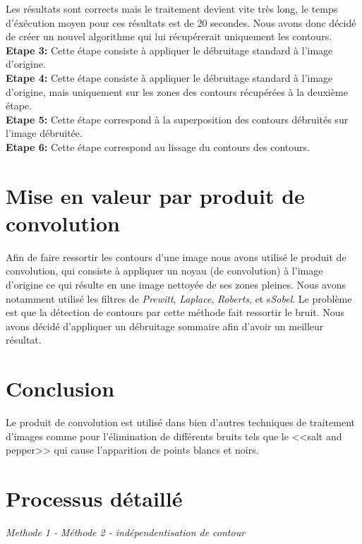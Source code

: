 \documentclass{article}
\begin{document}
			Les résultats sont corrects mais le traitement devient vite très long, le temps d'éxécution moyen pour ces résultats est de 20 secondes. Nous avons donc décidé de créer un nouvel algorithme qui lui récupérerait uniquement les contours.\\\textbf{Etape 3: }Cette étape consiste à appliquer le débruitage standard à l'image d'origine.\\
	\textbf{Etape 4: }Cette étape consiste à appliquer le débruitage standard à l'image d'origine, mais uniquement sur les zones des contours récupérées à la deuxième étape.\\
	\textbf{Etape 5: }Cette étape correspond à la superposition des contours débruités sur l'image débruitée.\\
	\textbf{Etape 6: }Cette étape correspond au lissage du contours des contours.\\
	
	\newpage
	
		\section{Mise en valeur par produit de convolution}
			Afin de faire ressortir les contours d'une image nous avons utilisé le produit de convolution, qui consiste à appliquer un noyau (de convolution) à l'image d'origine ce qui résulte en une image nettoyée de ses zones pleines. Nous avons notamment utilisé les filtres de \emph{Prewitt}, \emph{Laplace}, \emph{Roberts}, et s\emph{Sobel}. Le problème est que la détection de contours par cette méthode fait ressortir le bruit. Nous avons décidé d'appliquer un débruitage sommaire afin d'avoir un meilleur résultat.
			\section{Conclusion}Le produit de convolution est utilisé dans bien d'autres techniques de traitement d'images comme pour l'élimination de différents bruits tels que le <<salt and pepper>> qui cause l'apparition de points blancs et noirs.
	
		\section{Processus détaillé}
			\indent \emph{Methode 1 - }
			\indent	\emph{Méthode 2 - indépendentisation de contour}\\
			
	
	\newpage
	
	
	
\end{document}
